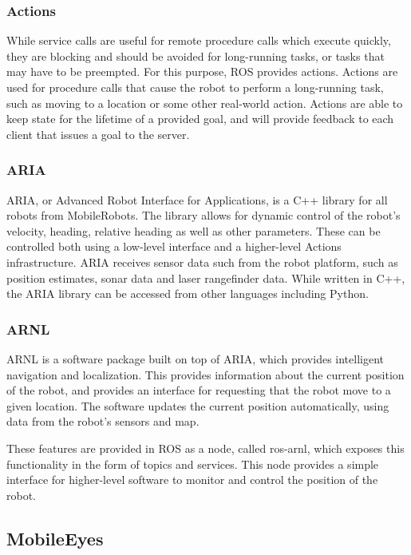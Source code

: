 \documentclass[\rootfolder/main.tex]{subfiles}
\begin{document}
\subsubsection{Actions}

While service calls are useful for remote procedure calls which execute quickly, they are blocking and should be avoided for long-running tasks, or tasks that may have to be preempted.
For this purpose, ROS provides actions.
Actions are used for procedure calls that cause the robot to perform a long-running task, such as moving to a location or some other real-world action.
Actions are able to keep state for the lifetime of a provided goal, and will provide feedback to each client that issues a goal to the server.

\subsubsection{ARIA}

ARIA, or Advanced Robot Interface for Applications, is a C++ library for all robots from MobileRobots.
The library allows for dynamic control of the robot's velocity, heading, relative heading as well as other parameters.
These can be controlled both using a low-level interface and a higher-level Actions infrastructure.
ARIA receives sensor data such from the robot platform, such as position estimates, sonar data and laser rangefinder data.
While written in C++, the ARIA library can be accessed from other languages including Python.

\subsubsection{ARNL}

ARNL is a software package built on top of ARIA, which provides intelligent navigation and localization.
This provides information about the current position of the robot, and provides an interface for requesting that the robot move to a given location.
The software updates the current position automatically, using data from the robot's sensors and map.

These features are provided in ROS as a node, called ros-arnl, which exposes this functionality in the form of topics and services.
This node provides a simple interface for higher-level software to monitor and control the position of the robot.

\subsection{MobileEyes}
\end{document}
